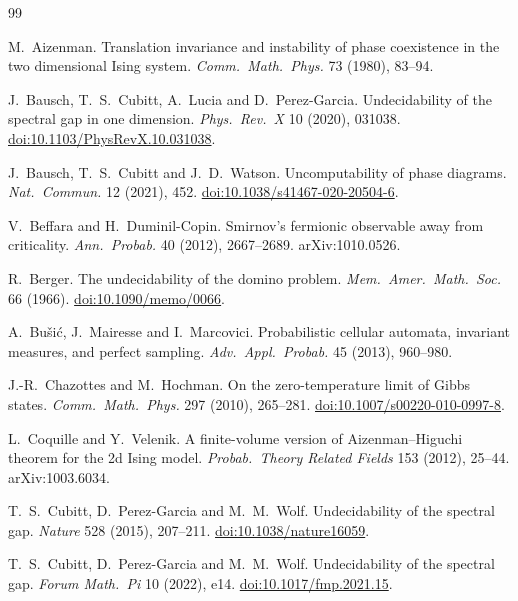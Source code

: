 \begin{thebibliography}{99}

 M.~Aizenman. Translation invariance and instability of phase coexistence in the two dimensional Ising system. \emph{Comm.\ Math.\ Phys.} 73 (1980), 83--94.

 J.~Bausch, T.~S.~Cubitt, A.~Lucia and D.~Perez-Garcia. Undecidability of the spectral gap in one dimension. \emph{Phys.\ Rev.\ X} 10 (2020), 031038. \href{https://doi.org/10.1103/PhysRevX.10.031038}{doi:10.1103/PhysRevX.10.031038}.

 J.~Bausch, T.~S.~Cubitt and J.~D.~Watson. Uncomputability of phase diagrams. \emph{Nat.\ Commun.} 12 (2021), 452. \href{https://doi.org/10.1038/s41467-020-20504-6}{doi:10.1038/s41467-020-20504-6}.

 V.~Beffara and H.~Duminil-Copin. Smirnov's fermionic observable away from criticality. \emph{Ann.\ Probab.} 40 (2012), 2667--2689. arXiv:1010.0526.

 R.~Berger. The undecidability of the domino problem. \emph{Mem.\ Amer.\ Math.\ Soc.} 66 (1966). \href{https://doi.org/10.1090/memo/0066}{doi:10.1090/memo/0066}.

 A.~Bu\v{s}i\'c, J.~Mairesse and I.~Marcovici. Probabilistic cellular automata, invariant measures, and perfect sampling. \emph{Adv.\ Appl.\ Probab.} 45 (2013), 960--980.

 J.-R.~Chazottes and M.~Hochman. On the zero-temperature limit of Gibbs states. \emph{Comm.\ Math.\ Phys.} 297 (2010), 265--281. \href{https://doi.org/10.1007/s00220-010-0997-8}{doi:10.1007/s00220-010-0997-8}.

 L.~Coquille and Y.~Velenik. A finite-volume version of Aizenman--Higuchi theorem for the 2d Ising model. \emph{Probab.\ Theory Related Fields} 153 (2012), 25--44. arXiv:1003.6034.

 T.~S.~Cubitt, D.~Perez-Garcia and M.~M.~Wolf. Undecidability of the spectral gap. \emph{Nature} 528 (2015), 207--211. \href{https://doi.org/10.1038/nature16059}{doi:10.1038/nature16059}.

 T.~S.~Cubitt, D.~Perez-Garcia and M.~M.~Wolf. Undecidability of the spectral gap. \emph{Forum Math.\ Pi} 10 (2022), e14. \href{https://doi.org/10.1017/fmp.2021.15}{doi:10.1017/fmp.2021.15}.


\end{thebibliography}
